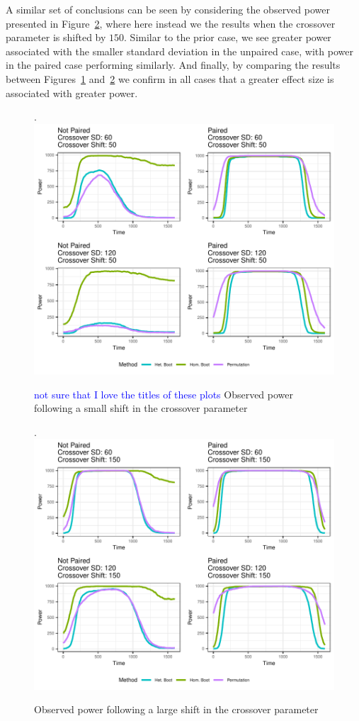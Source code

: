\documentclass{article}
\providecommand{\cn}[1]{\textcolor{blue}{#1}}
\begin{document}
A similar set of conclusions can be seen by considering the observed power presented in Figure~\ref{fig:log_shift_2}, where here instead we the results when the crossover parameter is shifted by $150$. Similar to the prior case, we see greater power associated with the smaller standard deviation in the unpaired case, with power in the paired case performing similarly. And finally, by comparing the results between Figures~\ref{fig:log_shift_1} and~\ref{fig:log_shift_2} we confirm in all cases that a greater effect size is associated with greater power. 

\begin{figure}[t]
\centering.
\includegraphics{log_shift_1.pdf}
\caption{\cn{not sure that I love the titles of these plots} Observed power following a small shift in the crossover parameter}
\label{fig:log_shift_1}
\end{figure}

\begin{figure}[t]
\centering.
\includegraphics{log_shift_2.pdf}
\caption{Observed power following a large shift in the crossover parameter}
\label{fig:log_shift_2}
\end{figure}
\end{document}
